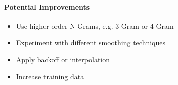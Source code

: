 \paragraph{Potential Improvements}
\begin{itemize}
    \item Use higher order N-Grams, e.g. 3-Gram or 4-Gram
    \item  Experiment with different smoothing techniques 
    \item  Apply backoff or interpolation
    \item  Increase training data
\end{itemize}